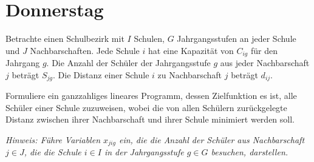 \documentclass{uebung_cs}
\begin{document}
\section*{Donnerstag}


\begin{aufgabe}
	Betrachte einen Schulbezirk mit $I$ Schulen, $G$ Jahrgangsstufen an jeder Schule und $J$ Nachbarschaften. Jede Schule $i$ hat eine Kapazität von $C_{ig}$ für den Jahrgang $g$. Die Anzahl der Schüler der Jahrgangsstufe $g$ aus jeder Nachbarschaft $j$ beträgt $S_{jg}$. Die Distanz einer Schule $i$ zu Nachbarschaft $j$ beträgt $d_{ij}$.
	
	Formuliere ein ganzzahliges lineares Programm, dessen Zielfunktion es ist, alle Schüler einer Schule zuzuweisen, wobei die von allen Schülern zurückgelegte Distanz zwischen ihrer Nachbarschaft und ihrer Schule minimiert werden soll.

	\emph{Hinweis: Führe Variablen $x_{jig}$ ein, die die Anzahl der Schüler aus Nachbarschaft $j \in J$, die die Schule $i \in I$ in der Jahrgangsstufe $g \in G$ besuchen, darstellen.}
\end{aufgabe}
\end{document}
